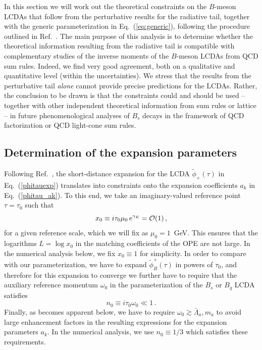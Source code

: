 \documentclass[a4paper,11pt]{article}
\begin{document}
In this section we will work out the theoretical constraints on the $B$-meson LCDAs that follow from the perturbative results for the radiative tail, together with the generic parameterization in Eq.~(\ref{eq:generic}),
following the procedure outlined in Ref.~\cite{Feldmann:2022uok}.
%
The main purpose of this analysis is to determine whether the theoretical information resulting from the radiative tail is compatible with complementary studies of the inverse moments of the $B$-meson LCDAs from QCD sum rules. Indeed, we find very good agreement, both on a qualitative and quantitative level (within the uncertainties).
We stress that the results from the perturbative tail \emph{alone} cannot provide precise predictions for the LCDAs.
Rather, the conclusion to be drawn is that the constraints could and should be used -- together with other independent theoretical information
from sum rules or lattice -- in future phenomenological analyses of $B_s$ decays in the framework of QCD factorization or QCD light-cone sum rules.


\subsection{Determination of the expansion parameters}

Following Ref.~\cite{Feldmann:2022uok}, the short-distance expansion for the LCDA $\tilde\phi_+(\tau)$ in Eq.~(\ref{phitauexp}) translates into constraints onto the expansion coefficients $a_k$ in Eq.~(\ref{phitau_ak}).
To this end, we take an imaginary-valued reference point $\tau=\tau_0$ such that 
$$ 
x_0 \equiv i \tau_0 \mu_0 \, e^{\gamma_E} = {\cal O}(1) \,,
$$
for a given reference scale, which we will fix as $\mu_0=1$~GeV. This ensures that the logarithms $L=\log x_0$ 
in the matching coefficients of the OPE are not large. In the numerical analysis below, we fix $x_0\equiv 1$ for simplicity.
%
In order to compare with our parameterization, we have to expand $\tilde \phi_B^+(\tau)$ in powers of $\tau_0$,
and therefore for this expansion to converge we further have to require that
the auxiliary reference momentum $\omega_0$ 
in the parameterization of the $B_s$ or $B_q$ LCDA satisfies
$$
n_0 \equiv i \tau_0 \omega_0 \ll 1 \,.
$$
Finally, as becomes apparent below, 
we have to require $\omega_0 \gtrsim \bar\Lambda_a, m_a$ to avoid large enhancement factors in the 
resulting expressions for the expansion parameters $a_k$. In the numerical analysis, we use $n_0\equiv 1/3$
which satisfies these requirements.
\end{document}
